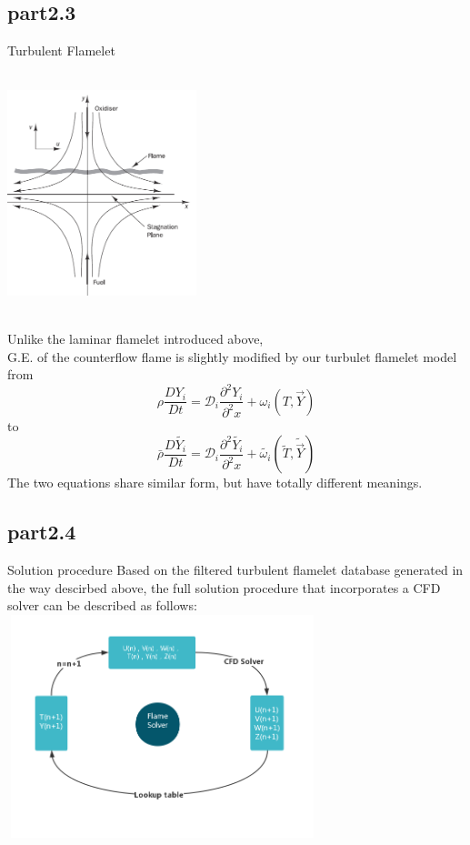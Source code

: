 	\subsection{part2.3}
		\begin{xframe}{Turbulent Flamelet}
			\begin{multicols}{2}
				\includegraphics[width=5.5cm, height=7cm]{../pic/counterflow.png}	
				
				Unlike the laminar flamelet introduced above,\\
				G.E. of the counterflow flame is slightly modified by our turbulet flamelet model from
				\begin{equation}
					\rho \frac{D Y_i}{D t} = \mathcal{D}_i\frac{\partial^2 Y_i}{\partial^2 x} + \omega_i(T, \vec{Y})
				\end{equation}
				to
				\begin{equation}
					\bar{\rho} \frac{D \tilde{Y_i}}{D t} = \mathcal{D}_i\frac{\partial^2 \tilde{Y_i}}{\partial^2 x} + \tilde{\omega_i}(\tilde{T}, \tilde{\vec{Y}})
				\end{equation}
				The two equations share similar form, but have totally different meanings.
			\end{multicols}
		\end{xframe}
	\subsection{part2.4}
		\begin{xframe}{Solution procedure}
			Based on the filtered turbulent flamelet database generated in the way descirbed above, the full solution procedure that incorporates a CFD solver can be described as follows:
			\centering
			\includegraphics[width=9cm, height=6.5cm]{../pic/solver.png}
		\end{xframe}
